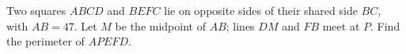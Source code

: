 Two squares $ABCD$ and $BEFC$ lie on opposite sides of their shared side $BC$, with $AB=47$. Let $M$ be the midpoint of $AB$; lines $DM$ and $FB$ meet at $P$. Find the perimeter of $APEFD$.

